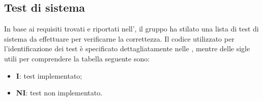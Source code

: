 \subsection{Test di sistema}
In base ai requisiti trovati e riportati nell', il gruppo ha stilato una lista di test di sistema da effettuare per verificarne la correttezza.
Il codice utilizzato per l'identificazione dei test è specificato dettagliatamente nelle , mentre delle sigle utili per comprendere la tabella seguente sono:
\begin{itemize}
	\item \textbf{I}: test implementato;
	\item \textbf{NI}: test non implementato.
\end{itemize} 

\newpage
\renewcommand{\arraystretch}{1.5}
\renewcommand\extrarowheight{1.5pt}
